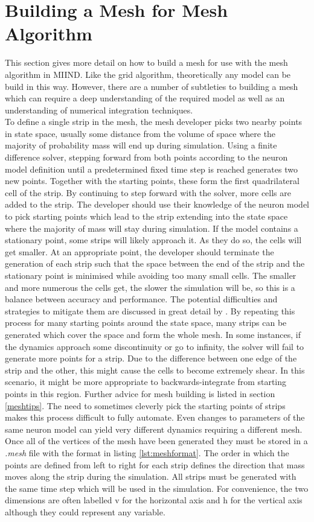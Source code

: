 \documentclass[utf8]{frontiers_suppmat} %
\begin{document}
\section{Building a Mesh for Mesh Algorithm}
\label{suppl:meshbuilding}
This section gives more detail on how to build a mesh for use with the mesh algorithm in MIIND. Like the grid algorithm, theoretically any model can be build in this way. However, there are a number of subtleties to building a mesh which can require a deep understanding of the required model as well as an understanding of numerical integration techniques.\\ 
To define a single strip in the mesh, the mesh developer picks two nearby points in state space, usually some distance from the volume of space where the majority of probability mass will end up during simulation. Using a finite difference solver, stepping forward from both points according to the neuron model definition until a predetermined fixed time step is reached generates two new points. Together with the starting points, these form the first quadrilateral cell of the strip. By continuing to step forward with the solver, more cells are added to the strip. The developer should use their knowledge of the neuron model to pick starting points which lead to the strip extending into the state space where the majority of mass will stay during simulation. If the model contains a stationary point, some strips will likely approach it. As they do so, the cells will get smaller. At an appropriate point, the developer should terminate the generation of each strip such that the space between the end of the strip and the stationary point is minimised while avoiding too many small cells. The smaller and more numerous the cells get, the slower the simulation will be, so this is a balance between accuracy and performance. The potential difficulties and strategies to mitigate them are discussed in great detail by \cite{de2019computational}. By repeating this process for many starting points around the state space, many strips can be generated which cover the space and form the whole mesh. In some instances, if the dynamics approach some discontinuity or go to infinity, the solver will fail to generate more points for a strip. Due to the difference between one edge of the strip and the other, this might cause the cells to become extremely shear. In this scenario, it might be more appropriate to backwards-integrate from starting points in this region. Further advice for mesh building is listed in section \ref{meshtips}. The need to sometimes cleverly pick the starting points of strips makes this process difficult to fully automate. Even changes to parameters of the same neuron model can yield very different dynamics requiring a different mesh. Once all of the vertices of the mesh have been generated they must be stored in a \textit{.mesh} file with the format in listing \ref{lst:meshformat}. The order in which the points are defined from left to right for each strip defines the direction that mass moves along the strip during the simulation. All strips must be generated with the same time step which will be used in the simulation. For convenience, the two dimensions are often labelled v for the horizontal axis and h for the vertical axis although they could represent any variable.
\end{document}
